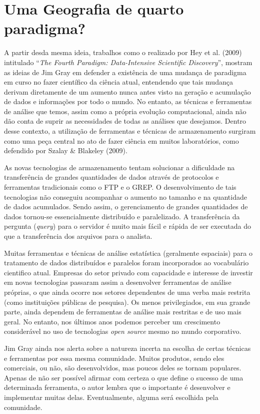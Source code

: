 \chapter{Uma Geografia de quarto paradigma?}
A partir desda mesma ideia, trabalhos como o realizado por Hey et al. (2009)\cite{HEY_etal09} intitulado “\textit{The Fourth Paradigm: Data-Intensive Scientific Discovery}”, mostram as ideias de Jim Gray em defender a existência de uma mudança de paradigma em curso no fazer científico da ciência atual, entendendo que tais mudança derivam diretamente de um aumento nunca antes visto na geração e acumulação de dados e informações por todo o mundo. No entanto, as técnicas e ferramentas de análise que temos, assim como a própria evolução computacional, ainda não dão conta de suprir as necessidades de todas as análises que desejamos. Dentro desse contexto, a utilização de ferramentas e técnicas de armazenamento surgiram como uma peça central no ato de fazer ciência em muitos laboratórios, como defendido por Szalay \& Blakeley (2009)\cite{SZALEY_BLAKELEY}. 

As novas tecnologias de armazenamento tentam solucionar a dificuldade na transferência de grandes quantidades de dados através de protocolos e ferramentas tradicionais como o FTP e o GREP. O desenvolvimento de tais tecnologias não conseguiu acompanhar o aumento no tamanho e na quantidade de dados acumulados. Sendo assim, o gerenciamento de grandes quantidades de dados tornou-se essencialmente distribuído e paralelizado. A transferência da pergunta (\textit{query}) para o servidor é muito mais fácil e rápida de ser executada do que a transferência dos arquivos para o analista.

Muitas ferramentas e técnicas de análise estatística (geralmente espaciais) para o tratamento de dados distribuídos e paralelos foram incorporados ao vocabulário cientifico atual. Empresas do setor privado com capacidade e interesse de investir em novas tecnologias passaram assim a desenvolver ferramentas de análise próprias, o que ainda ocorre nos setores dependentes de uma verba mais restrita (como instituições públicas de pesquisa). Os menos privilegiados, em sua grande parte, ainda dependem de ferramentas de análise mais restritas e de uso mais geral. No entanto, nos últimos anos podemos perceber um crescimento considerável no uso de tecnologias \textit{open source} mesmo no mundo corporativo. 

Jim Gray ainda nos alerta sobre a natureza incerta na escolha de certas técnicas e ferramentas por essa mesma comunidade. Muitos produtos, sendo eles comerciais, ou não, são desenvolvidos, mas poucos deles se tornam populares. Apenas de não ser possível afirmar com certeza o que define o sucesso de uma determinada ferramenta, o autor lembra que o importante é desenvolver e implementar muitas delas. Eventualmente, alguma será escolhida pela comunidade. 

